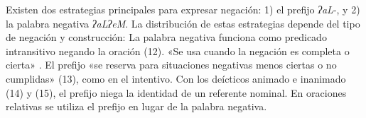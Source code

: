 Existen dos estrategias principales para expresar negación: 1) el prefijo {\setmainfont{Charis SIL}\textit{ʔaL}-}, y 2) la palabra negativa {\setmainfont{Charis SIL}\textit{ʔaLʔeM}}. La distribución de estas estrategias depende del tipo de negación y construcción: La palabra negativa funciona como predicado intransitivo negando la oración (12). «Se usa cuando la negación es completa o cierta» \textcolor{MidnightBlue}{\citep[pág. 32]{chinanteco}}. El prefijo «se reserva para situaciones negativas menos ciertas o no cumplidas» (13), como en el intentivo. Con los deícticos animado e inanimado (14) y (15), el prefijo niega la identidad de un referente nominal. En oraciones relativas se utiliza el prefijo en lugar de la palabra negativa.